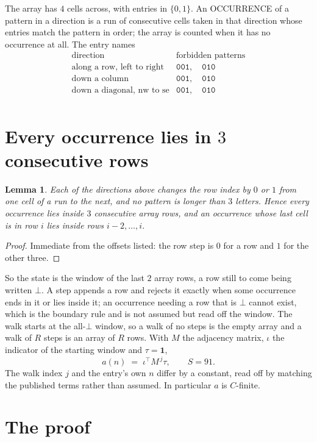 \documentclass[11pt,a4paper]{article}
\theoremstyle{plain}
\newtheorem{lemma}[theorem]{Lemma}
\theoremstyle{definition}
\begin{document}
The array has $4$ cells across, with entries in $\{0,1\}$. An OCCURRENCE of a pattern in a
direction is a run of consecutive cells taken in that direction whose entries match the pattern
in order; the array is counted when it has no occurrence at all. The entry names
\[
\begin{array}{ll}
\text{direction} & \text{forbidden patterns} \\[2pt]
\text{along a row, left to right} & \mathtt{001},\quad \mathtt{010} \\
\text{down a column} & \mathtt{001},\quad \mathtt{010} \\
\text{down a diagonal, nw to se} & \mathtt{001},\quad \mathtt{010} \\
\end{array}
\]


\section{Every occurrence lies in $3$ consecutive rows}

\begin{lemma}\label{lem:win}
Each of the directions above changes the row index by $0$ or $1$ from one cell of a run to the
next, and no pattern is longer than $3$ letters. Hence every occurrence lies inside $3$
consecutive array rows, and an occurrence whose last cell is in row $i$ lies inside rows
$i-2,\dots,i$.
\end{lemma}

\begin{proof}
Immediate from the offsets listed: the row step is $0$ for a row and $1$ for the other three.
\end{proof}

So the state is the window of the last $2$ array rows, a row still to come being written
$\bot$. A step appends a row and rejects it exactly when some occurrence ends in it or lies
inside it; an occurrence needing a row that is $\bot$ cannot exist, which is the boundary rule
and is not assumed but read off the window. The walk starts at the all-$\bot$ window, so a walk
of no steps is the empty array and a walk of $R$ steps is an array of $R$ rows. With $M$ the
adjacency matrix, $\iota$ the indicator of the starting window and $\tau=\mathbf{1}$,
\[
a(n)\;=\;\iota^{\!\top}M^{\,j}\tau ,\qquad S=91.
\]
The walk index $j$ and the entry's own $n$ differ by a constant, read off by matching the
published terms rather than assumed. In particular $a$ is $C$-finite.

\section{The proof}
\end{document}

